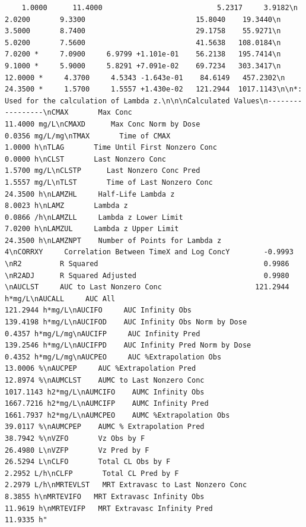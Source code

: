 \documentclass[]{krantz}
\theoremstyle{definition}
\theoremstyle{definition}
\theoremstyle{definition}
\theoremstyle{remark}
\begin{document}
\begin{verbatim}
    1.0000      11.4000                           5.2317     3.9182\n     2.0200       9.3300                          15.8040    19.3440\n     3.5000       8.7400                          29.1758    55.9271\n     5.0200       7.5600                          41.5638   108.0184\n     7.0200 *     7.0900     6.9799 +1.101e-01    56.2138   195.7414\n     9.1000 *     5.9000     5.8291 +7.091e-02    69.7234   303.3417\n    12.0000 *     4.3700     4.5343 -1.643e-01    84.6149   457.2302\n    24.3500 *     1.5700     1.5557 +1.430e-02   121.2944  1017.1143\n\n*: Used for the calculation of Lambda z.\n\n\nCalculated Values\n-----------------\nCMAX       Max Conc                                       11.4000 mg/L\nCMAXD      Max Conc Norm by Dose                           0.0356 mg/L/mg\nTMAX       Time of CMAX                                    1.0000 h\nTLAG       Time Until First Nonzero Conc                   0.0000 h\nCLST       Last Nonzero Conc                               1.5700 mg/L\nCLSTP      Last Nonzero Conc Pred                          1.5557 mg/L\nTLST       Time of Last Nonzero Conc                      24.3500 h\nLAMZHL     Half-Life Lambda z                              8.0023 h\nLAMZ       Lambda z                                        0.0866 /h\nLAMZLL     Lambda z Lower Limit                            7.0200 h\nLAMZUL     Lambda z Upper Limit                           24.3500 h\nLAMZNPT    Number of Points for Lambda z                   4\nCORRXY     Correlation Between TimeX and Log ConcY        -0.9993 \nR2         R Squared                                       0.9986 \nR2ADJ      R Squared Adjusted                              0.9980 \nAUCLST     AUC to Last Nonzero Conc                      121.2944 h*mg/L\nAUCALL     AUC All                                       121.2944 h*mg/L\nAUCIFO     AUC Infinity Obs                              139.4198 h*mg/L\nAUCIFOD    AUC Infinity Obs Norm by Dose                   0.4357 h*mg/L/mg\nAUCIFP     AUC Infinity Pred                             139.2546 h*mg/L\nAUCIFPD    AUC Infinity Pred Norm by Dose                  0.4352 h*mg/L/mg\nAUCPEO     AUC %Extrapolation Obs                         13.0006 %\nAUCPEP     AUC %Extrapolation Pred                        12.8974 %\nAUMCLST    AUMC to Last Nonzero Conc                    1017.1143 h2*mg/L\nAUMCIFO    AUMC Infinity Obs                            1667.7216 h2*mg/L\nAUMCIFP    AUMC Infinity Pred                           1661.7937 h2*mg/L\nAUMCPEO    AUMC %Extrapolation Obs                        39.0117 %\nAUMCPEP    AUMC % Extrapolation Pred                      38.7942 %\nVZFO       Vz Obs by F                                    26.4980 L\nVZFP       Vz Pred by F                                   26.5294 L\nCLFO       Total CL Obs by F                               2.2952 L/h\nCLFP       Total CL Pred by F                              2.2979 L/h\nMRTEVLST   MRT Extravasc to Last Nonzero Conc              8.3855 h\nMRTEVIFO   MRT Extravasc Infinity Obs                     11.9619 h\nMRTEVIFP   MRT Extravasc Infinity Pred                    11.9335 h"
\end{verbatim}
\end{document}
